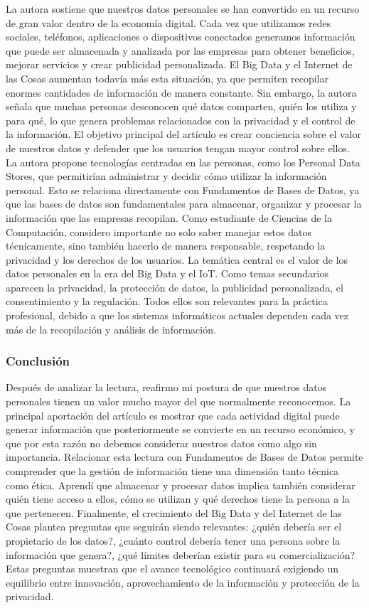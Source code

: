 La autora sostiene que nuestros datos personales se han convertido en un recurso de gran valor dentro de la economía digital. 
Cada vez que utilizamos redes sociales, teléfonos, aplicaciones o dispositivos conectados generamos información que puede 
ser almacenada y analizada por las empresas para obtener beneficios, mejorar servicios y crear publicidad personalizada.
El Big Data y el Internet de las Cosas aumentan todavía más esta situación, ya que permiten recopilar enormes cantidades
 de información de manera constante. Sin embargo, la autora señala que muchas personas desconocen qué datos comparten, 
 quién los utiliza y para qué, lo que genera problemas relacionados con la privacidad y el control de la información.
El objetivo principal del artículo es crear conciencia sobre el valor de nuestros datos y defender que los usuarios 
tengan mayor control sobre ellos. La autora propone tecnologías centradas en las personas, como los Personal Data Stores, 
que permitirían administrar y decidir cómo utilizar la información personal.
Esto se relaciona directamente con Fundamentos de Bases de Datos, ya que las bases de datos son fundamentales para almacenar, 
organizar y procesar la información que las empresas recopilan. Como estudiante de Ciencias de la Computación, 
considero importante no solo saber manejar estos datos técnicamente, sino también hacerlo de manera responsable, respetando 
la privacidad y los derechos de los usuarios.
La temática central es el valor de los datos personales en la era del Big Data y el IoT. Como temas secundarios aparecen 
la privacidad, la protección de datos, la publicidad personalizada, el consentimiento y la regulación. Todos ellos son 
relevantes para la práctica profesional, debido a que los sistemas informáticos actuales dependen cada vez más de la 
recopilación y análisis de información.

\subsubsection*{Conclusión}

Después de analizar la lectura, reafirmo mi postura de que nuestros datos personales tienen un valor mucho mayor del 
que normalmente reconocemos. La principal aportación del artículo es mostrar que cada actividad digital puede generar 
información que posteriormente se convierte en un recurso económico, y que por esta razón no debemos considerar nuestros 
datos como algo sin importancia.
Relacionar esta lectura con Fundamentos de Bases de Datos permite comprender que la gestión de información tiene una 
dimensión tanto técnica como ética. Aprendí que almacenar y procesar datos implica también considerar quién tiene acceso 
a ellos, cómo se utilizan y qué derechos tiene la persona a la que pertenecen. 
Finalmente, el crecimiento del Big Data y del Internet de las Cosas plantea preguntas que seguirán siendo relevantes: 
¿quién debería ser el propietario de los datos?, ¿cuánto control debería tener una persona sobre la información que genera?, 
¿qué límites deberían existir para su comercialización? Estas preguntas muestran que el avance tecnológico continuará exigiendo 
un equilibrio entre innovación, aprovechamiento de la información y protección de la privacidad.


